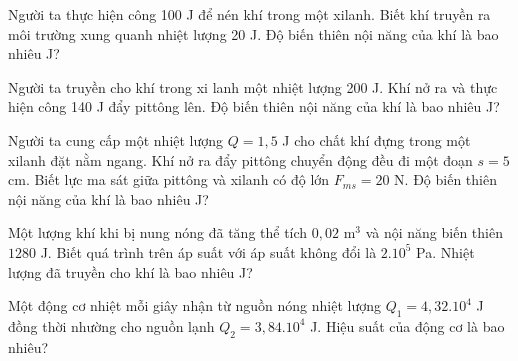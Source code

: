 \begin{ex}
Người ta thực hiện công 100 J để nén khí trong một xilanh. Biết khí truyền ra môi trường xung quanh nhiệt lượng 20 J. Độ biến thiên nội năng của khí là bao nhiêu J?
\end{ex}

\begin{ex}
Người ta truyền cho khí trong xi lanh một nhiệt lượng 200 J. Khí nở ra và thực hiện công 140 J đẩy pittông lên. Độ biến thiên nội năng của khí là bao nhiêu J?
\end{ex}

\begin{ex}
Người ta cung cấp một nhiệt lượng $Q = 1,5$ J cho chất khí đựng trong một xilanh đặt nằm ngang. Khí nở ra đẩy pittông chuyển động đều đi một đoạn $s = 5$ cm. Biết lực ma sát giữa pittông và xilanh có độ lớn $F_{ms} = 20$ N. Độ biến thiên nội năng của khí là bao nhiêu J?
\end{ex}

\begin{ex}
Một lượng khí khi bị nung nóng đã tăng thể tích $0,02$ m$^3$ và nội năng biến thiên $1280$ J. Biết quá trình trên áp suất với áp suất không đổi là $2.10^5$ Pa. Nhiệt lượng đã truyền cho khí là bao nhiêu J?
\end{ex}


\begin{ex}
Một động cơ nhiệt mỗi giây nhận từ nguồn nóng nhiệt lượng $Q_1 = 4,32.10^4$ J đồng thời nhường cho nguồn lạnh $Q_2 = 3,84.10^4$ J. Hiệu suất của động cơ là bao nhiêu?
\end{ex}

